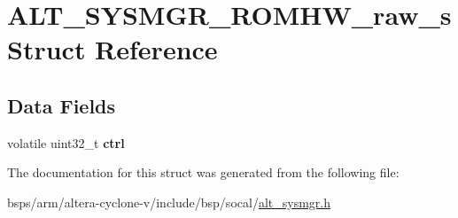 \hypertarget{structALT__SYSMGR__ROMHW__raw__s}{}\section{A\+L\+T\+\_\+\+S\+Y\+S\+M\+G\+R\+\_\+\+R\+O\+M\+H\+W\+\_\+raw\+\_\+s Struct Reference}
\label{structALT__SYSMGR__ROMHW__raw__s}
\subsection*{Data Fields}
\begin{DoxyCompactItemize}
\item 
\mbox{\label{structALT__SYSMGR__ROMHW__raw__s_afaf5298c8b8d97516bb3fbcabcdd3835}} 
volatile uint32\+\_\+t {\bfseries ctrl}
\end{DoxyCompactItemize}


The documentation for this struct was generated from the following file\+:\begin{DoxyCompactItemize}
\item 
bsps/arm/altera-\/cyclone-\/v/include/bsp/socal/\mbox{\hyperlink{alt__sysmgr_8h}{alt\+\_\+sysmgr.\+h}}\end{DoxyCompactItemize}
